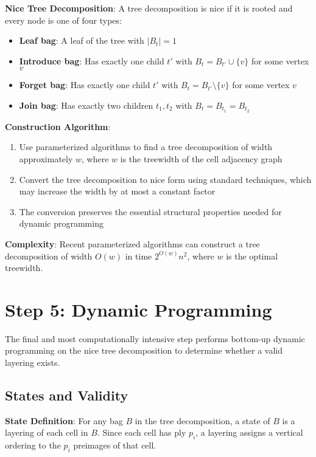 \textbf{Nice Tree Decomposition}: A tree decomposition is nice if it is rooted and every node is one of four types:
\begin{itemize}
\item \textbf{Leaf bag}: A leaf of the tree with $|B_t| = 1$
\item \textbf{Introduce bag}: Has exactly one child $t'$ with $B_t = B_{t'} \cup \{v\}$ for some vertex $v$
\item \textbf{Forget bag}: Has exactly one child $t'$ with $B_t = B_{t'} \setminus \{v\}$ for some vertex $v$
\item \textbf{Join bag}: Has exactly two children $t_1, t_2$ with $B_t = B_{t_1} = B_{t_2}$
\end{itemize}

\textbf{Construction Algorithm}: 
\begin{enumerate}
\item Use parameterized algorithms to find a tree decomposition of width approximately $w$, where $w$ is the treewidth of the cell adjacency graph
\item Convert the tree decomposition to nice form using standard techniques, which may increase the width by at most a constant factor
\item The conversion preserves the essential structural properties needed for dynamic programming
\end{enumerate}

\textbf{Complexity}: Recent parameterized algorithms can construct a tree decomposition of width $O(w)$ in time $2^{O(w)}n^2$, where $w$ is the optimal treewidth.

\section{Step 5: Dynamic Programming}

The final and most computationally intensive step performs bottom-up dynamic programming on the nice tree decomposition to determine whether a valid layering exists.

\subsection{States and Validity}

\textbf{State Definition}: For any bag $B$ in the tree decomposition, a state of $B$ is a layering of each cell in $B$. Since each cell has ply $p_i$, a layering assigns a vertical ordering to the $p_i$ preimages of that cell.

